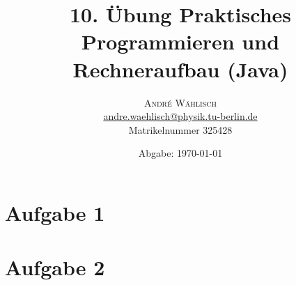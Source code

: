 \documentclass{scrartcl}
\begin{document}
\title{10. Übung Praktisches Programmieren und Rechneraufbau (Java)}

\date{Abgabe: \today}

\author{
\large
\textsc{André Wählisch}\\[2mm]
\normalsize \href{mailto:andre.waehlisch@physik.tu-berlin.de}{andre.waehlisch@physik.tu-berlin.de} \\
\normalsize Matrikelnummer 325428 
}

\maketitle

\section*{Aufgabe 1}



\section*{Aufgabe 2}
\end{document}
